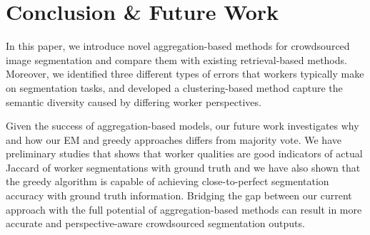 \section{Conclusion \& Future Work}
In this paper, we introduce novel aggregation-based methods for crowdsourced image segmentation and compare them with existing retrieval-based methods. Moreover, we identified three different types of errors that workers typically make on segmentation tasks, and developed a clustering-based method capture the semantic diversity caused by differing worker perspectives.
\par Given the success of aggregation-based models, our future work investigates why and how our EM and greedy approaches differs from majority vote. We have preliminary studies that shows that worker qualities are good indicators of actual Jaccard of worker segmentations with ground truth and we have also shown that the greedy algorithm is capable of achieving close-to-perfect segmentation accuracy with ground truth information. Bridging the gap between our current approach with the full potential of aggregation-based methods can result in more accurate and perspective-aware crowdsourced segmentation outputs.